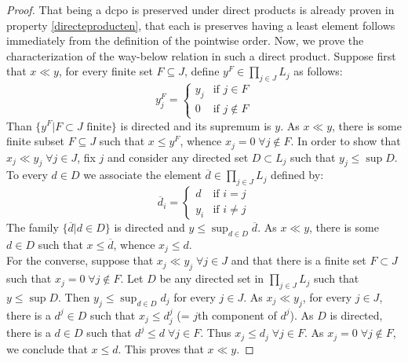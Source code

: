 \documentclass[a4paper,12pt]{article}
\begin{document}
\begin{proof}
That being a dcpo is preserved under direct products is already proven in property \ref{directeproducten}, that each is preserves having a least element follows immediately from the definition of the pointwise order. Now, we prove the characterization of the way-below relation in such a direct product.  Suppose first that $x \ll y$, for every finite set $F \subseteq J$, define $y^F \in \prod_{j \in J}L_j$ as follows:
\begin{equation*}
  y_j^F=\begin{cases}
    y_j & \text{if $j \in F $}\\
    0 & \text{if $j \not\in F $}
  \end{cases}
\end{equation*}
Than $\{y^F | F \subset J \text{ finite}\}$ is directed and its supremum is $y$. As $x \ll y$, there is some finite subset $F \subseteq J$ such that $x \leq y^F$, whence $x_j = 0 \;\forall j \not\in F$.
In order to show that $x_j \ll y_j \;\forall j \in J$, fix $j$ and consider any directed set $D \subset L_j$ such that $y_j \leq \sup D$. To every $d \in D$ we associate the element $\overline{d} \in \prod_{j \in J}L_j$ defined by:
\begin{equation*}
  \overline{d}_i=\begin{cases}
    d & \text{if $i = j$}\\
    y_i & \text{if $i \neq j $}
  \end{cases}
\end{equation*}
The family $\{\overline{d}|d\in D\}$ is directed and $y \leq \sup_{d \in D}\overline{d}$. As $x \ll y$, there is some $d \in D$ such that $x \leq \overline{d}$, whence $x_j \leq d$.\\

For the converse, suppose that $x_j \ll y_j \;\forall j \in J$ and that there is a finite set $F \subset J$ such that $x_j = 0 \;\forall j \not\in F$. Let $D$ be any directed set in $\prod_{j \in J}L_j$ such that $y \leq \sup D$. Then $y_j \leq \sup_{d\in D}d_j$ for every $j \in J$. As $x_j \ll y_j$, for every $j \in J$, there is a $d^j \in D$ such that $x_j \leq d^j_j$ (= $j$th component of $d^j$). As $D$ is directed, there is a $d \in D$ such that $d^j \leq d \;\forall j \in F$. Thus $x_j \leq d_j \;\forall j \in F$. As $x_j = 0 \;\forall j \not\in F$, we conclude that $x \leq d$. This proves that $x \ll y$.

\end{proof}
\end{document}
